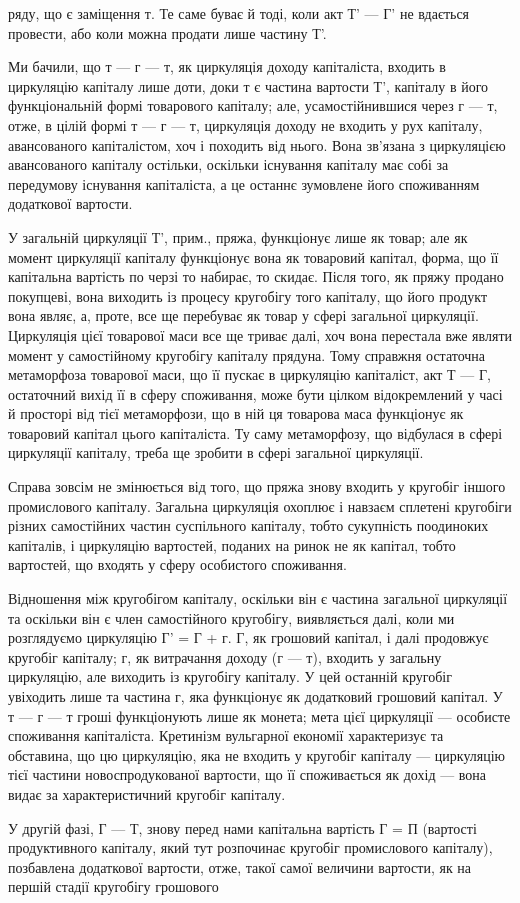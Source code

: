 \parcont{}  %
ряду, що є заміщення т. Те саме буває й тоді, коли акт Т' — Г' не
вдається провести, або коли можна продати лише частину Т'.

Ми бачили, що т — г — т, як циркуляція доходу капіталіста, входить
в циркуляцію капіталу лише доти, доки т є частина вартости Т', капіталу
в його функціональній формі товарового капіталу; але, усамостійнившися
через г — т, отже, в цілій формі т — г — т, циркуляція доходу не входить
у рух капіталу, авансованого капіталістом, хоч і походить від нього.
Вона зв’язана з циркуляцією авансованого капіталу остільки, оскільки
існування капіталу має собі за передумову існування капіталіста, а це
останнє зумовлене його споживанням додаткової вартости.

У загальній циркуляції Т', прим., пряжа, функціонує лише як товар;
але як момент циркуляції капіталу функціонує вона як товаровий
капітал, форма, що її капітальна вартість по черзі то набирає, то скидає.
Після того, як пряжу продано покупцеві, вона виходить із процесу
кругобігу того капіталу, що його продукт вона являє, а, проте, все ще
перебуває як товар у сфері загальної циркуляції. Циркуляція цієї товарової
маси все ще триває далі, хоч вона перестала вже являти момент
у самостійному кругобігу капіталу прядуна. Тому справжня остаточна
метаморфоза товарової маси, що її пускає в циркуляцію капіталіст, акт
Т — Г, остаточний вихід її в сферу споживання, може бути цілком відокремлений
у часі й просторі від тієї метаморфози, що в ній ця товарова
маса функціонує як товаровий капітал цього капіталіста. Ту саму метаморфозу,
що відбулася в сфері циркуляції капіталу, треба ще зробити
в сфері загальної циркуляції.

Справа зовсім не змінюється від того, що пряжа знову входить
у кругобіг іншого промислового капіталу. Загальна циркуляція охоплює
і навзаєм сплетені кругобіги різних самостійних частин суспільного капіталу,
тобто сукупність поодиноких капіталів, і циркуляцію вартостей, поданих
на ринок не як капітал, тобто вартостей, що входять у сферу особистого
споживання.

Відношення між кругобігом капіталу, оскільки він є частина загальної
циркуляції та оскільки він є член самостійного кругобігу, виявляється
далі, коли ми розглядуємо циркуляцію Г' = Г + г. Г, як грошовий капітал,
і далі продовжує кругобіг капіталу; г, як витрачання доходу (г — т),
входить у загальну циркуляцію, але виходить із кругобігу капіталу. У цей
останній кругобіг увіходить лише та частина г, яка функціонує як додатковий
грошовий капітал. У т — г — т гроші функціонують лише як
монета; мета цієї циркуляції — особисте споживання капіталіста. Кретинізм
вульгарної економії характеризує та обставина, що цю циркуляцію, яка
не входить у кругобіг капіталу — циркуляцію тієї частини новоспродукованої
вартости, що її споживається як дохід — вона видає за характеристичний
кругобіг капіталу.

У другій фазі, Г — Т, знову перед нами капітальна вартість
Г = П (вартості продуктивного капіталу, який тут розпочинає кругобіг
промислового капіталу), позбавлена додаткової вартости, отже, такої
самої величини вартости, як на першій стадії кругобігу грошового
\parbreak{}  %
